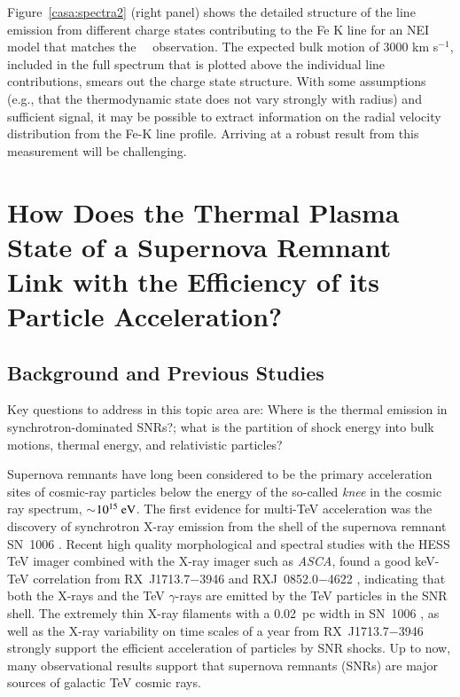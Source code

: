 \documentclass[11pt,a4paper]{article}
\begin{document}
{Figure~\ref{casa:spectra2} (right panel) shows the detailed structure of
the line emission from different charge states contributing to the Fe
K line for an NEI model that matches the \suzaku\ \casa\ observation.
The expected bulk motion of 3000 km s$^{-1}$, included in the full
spectrum that is plotted above the individual line contributions,
smears out the charge state structure.  With some assumptions (e.g.,
that the thermodynamic state does not vary strongly with radius) and
sufficient signal, it may be possible to extract information on the
radial velocity distribution from the Fe-K line profile. Arriving at a
robust result from this measurement will be challenging.

\section{How Does the Thermal Plasma State of a Supernova Remnant
 Link with the Efficiency of its Particle Acceleration?  }

\subsection{Background and Previous Studies}

Key questions to address in this topic area are: Where is the thermal
emission in synchrotron-dominated SNRs?; what is the partition of
shock energy into bulk motions, thermal energy, and relativistic
particles?

Supernova remnants have long been considered to be the primary
acceleration sites of cosmic-ray particles below the energy of the
so-called {\it knee} in the cosmic ray spectrum, $\sim$$10^{15}~{\rm
  eV}$.  The first evidence for multi-TeV acceleration was the
discovery of synchrotron X-ray emission from the shell of the
supernova remnant SN~1006 \citep{koyama95}. 
Recent high quality morphological
and spectral studies with the HESS TeV imager combined with the X-ray
imager such as {\it ASCA}, found a good keV-TeV correlation from RX~J1713.7$-$3946 \citep{Aharonian04} 
and RXJ~0852.0$-$4622 \citep{Aharonian07}, indicating that both the X-rays and the TeV
$\gamma$-rays are emitted by the TeV particles in the SNR shell. 
The extremely thin X-ray filaments with a 0.02~pc width in SN~1006
\citep{Bamba03,long03}, as well as the X-ray variability on time
scales of a year from RX~J1713.7$-$3946 \citep{Uchiyama07} strongly
support the efficient acceleration of particles by SNR shocks.  Up to
now, many observational results support that supernova remnants (SNRs)
are major sources of galactic TeV cosmic rays.

}
\end{document}
